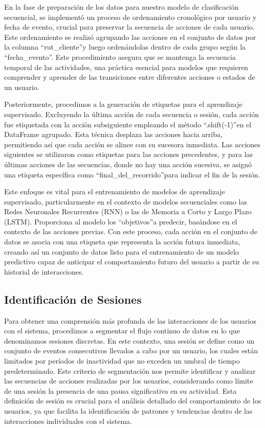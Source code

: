 En la fase de preparación de los datos para nuestro modelo de clasificación secuencial, se implementó un proceso de ordenamiento cronológico por usuario y fecha de evento, crucial para preservar la secuencia de acciones de cada usuario. Este ordenamiento se realizó agrupando las acciones en el conjunto de datos por la columna \textquotedblleft rut\_cliente\textquotedblright y luego ordenándolas dentro de cada grupo según la \textquotedblleft fecha\_evento\textquotedblright. Este procedimiento asegura que se mantenga la secuencia temporal de las actividades, una práctica esencial para modelos que requieren comprender y aprender de las transiciones entre diferentes acciones o estados de un usuario.

Posteriormente, procedimos a la generación de etiquetas para el aprendizaje supervisado. Excluyendo la última acción de cada secuencia o sesión, cada acción fue etiquetada con la acción subsiguiente empleando el método \textquotedblleft .shift(-1)\textquotedblright en el DataFrame agrupado. Esta técnica desplaza las acciones hacia arriba, permitiendo así que cada acción se alinee con su sucesora inmediata. Las acciones siguientes se utilizaron como etiquetas para las acciones precedentes, y para las últimas acciones de las secuencias, donde no hay una acción sucesiva, se asignó una etiqueta específica como \textquotedblleft final\_del\_recorrido\textquotedblright para indicar el fin de la sesión.

Este enfoque es vital para el entrenamiento de modelos de aprendizaje supervisado, particularmente en el contexto de modelos secuenciales como las Redes Neuronales Recurrentes (RNN) o las de Memoria a Corto y Largo Plazo (LSTM). Proporciona al modelo los \textquotedblleft objetivos\textquotedblright a predecir, basándose en el contexto de las acciones previas. Con este proceso, cada acción en el conjunto de datos se asocia con una etiqueta que representa la acción futura inmediata, creando así un conjunto de datos listo para el entrenamiento de un modelo predictivo capaz de anticipar el comportamiento futuro del usuario a partir de su historial de interacciones.

\subsection{Identificación de Sesiones}

Para obtener una comprensión más profunda de las interacciones de los usuarios con el sistema, procedimos a segmentar el flujo continuo de datos en lo que denominamos sesiones discretas. En este contexto, una sesión se define como un conjunto de eventos consecutivos llevados a cabo por un usuario, los cuales están limitados por períodos de inactividad que no exceden un umbral de tiempo predeterminado. Este criterio de segmentación nos permite identificar y analizar las secuencias de acciones realizadas por los usuarios, considerando como límite de una sesión la presencia de una pausa significativa en su actividad. Esta definición de sesión es crucial para el análisis detallado del comportamiento de los usuarios, ya que facilita la identificación de patrones y tendencias dentro de las interacciones individuales con el sistema.

